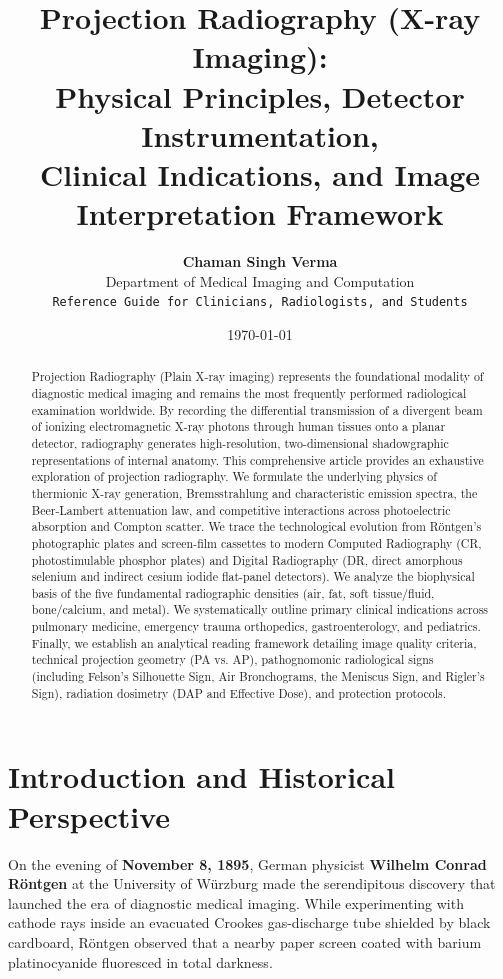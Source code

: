 \documentclass[11pt,a4paper]{article}
\title{\textbf{\huge Projection Radiography (X-ray Imaging):}\\[0.3em]
\Large Physical Principles, Detector Instrumentation,\\
Clinical Indications, and Image Interpretation Framework}
\author{\textbf{Chaman Singh Verma}\\[0.2em]
\small Department of Medical Imaging and Computation\\
\small \texttt{Reference Guide for Clinicians, Radiologists, and Students}}
\date{\today}
\begin{document}
\maketitle

\begin{abstract}
Projection Radiography (Plain X-ray imaging) represents the foundational modality of diagnostic medical imaging and remains the most frequently performed radiological examination worldwide. By recording the differential transmission of a divergent beam of ionizing electromagnetic X-ray photons through human tissues onto a planar detector, radiography generates high-resolution, two-dimensional shadowgraphic representations of internal anatomy. This comprehensive article provides an exhaustive exploration of projection radiography. We formulate the underlying physics of thermionic X-ray generation, Bremsstrahlung and characteristic emission spectra, the Beer-Lambert attenuation law, and competitive interactions across photoelectric absorption and Compton scatter. We trace the technological evolution from Röntgen's photographic plates and screen-film cassettes to modern Computed Radiography (CR, photostimulable phosphor plates) and Digital Radiography (DR, direct amorphous selenium and indirect cesium iodide flat-panel detectors). We analyze the biophysical basis of the five fundamental radiographic densities (air, fat, soft tissue/fluid, bone/calcium, and metal). We systematically outline primary clinical indications across pulmonary medicine, emergency trauma orthopedics, gastroenterology, and pediatrics. Finally, we establish an analytical reading framework detailing image quality criteria, technical projection geometry (PA vs. AP), pathognomonic radiological signs (including Felson's Silhouette Sign, Air Bronchograms, the Meniscus Sign, and Rigler's Sign), radiation dosimetry (DAP and Effective Dose), and protection protocols.
\end{abstract}

\tableofcontents
\newpage

\section{Introduction and Historical Perspective}

On the evening of \textbf{November 8, 1895}, German physicist \textbf{Wilhelm Conrad Röntgen} at the University of Würzburg made the serendipitous discovery that launched the era of diagnostic medical imaging. While experimenting with cathode rays inside an evacuated Crookes gas-discharge tube shielded by black cardboard, Röntgen observed that a nearby paper screen coated with barium platinocyanide fluoresced in total darkness.
\end{document}
